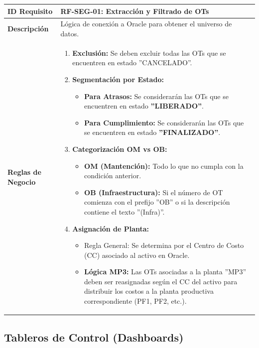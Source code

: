 \documentclass[11pt, letterpaper]{article}
\begin{document}
\begin{longtable}{|p{3.5cm}|p{11.5cm}|}
\hline
\rowcolor{headergray} \textbf{ID Requisito} & \textbf{RF-SEG-01: Extracción y Filtrado de OTs} \\ \hline
\textbf{Descripción} & Lógica de conexión a Oracle para obtener el universo de datos. \\ \hline
\textbf{Reglas de Negocio} & 
\begin{enumerate}
    \item \textbf{Exclusión:} Se deben excluir todas las OTs que se encuentren en estado ''CANCELADO''.
    \item \textbf{Segmentación por Estado:}
    \begin{itemize}
        \item \textbf{Para Atrasos:} Se considerarán las OTs que se encuentren en estado \textbf{''LIBERADO''}.
        \item \textbf{Para Cumplimiento:} Se considerarán las OTs que se encuentren en estado \textbf{''FINALIZADO''}.
    \end{itemize}
    \item \textbf{Categorización OM vs OB:}
    \begin{itemize}\item \textbf{OM (Mantención):} Todo lo que no cumpla con la condición anterior.
        \item \textbf{OB (Infraestructura):} Si el número de OT comienza con el prefijo ''OB'' o si la descripción contiene el texto ''(Infra)''.
        
    \end{itemize}
    \item \textbf{Asignación de Planta:}
    \begin{itemize}
        \item Regla General: Se determina por el Centro de Costo (CC) asociado al activo en Oracle.
        \item \textbf{Lógica MP3:} Las OTs asociadas a la planta ''MP3'' deben ser reasignadas según el CC del activo para distribuir los costos a la planta productiva correspondiente (PF1, PF2, etc.).
    \end{itemize}
\end{enumerate} \\ \hline
\end{longtable}

\subsection{Tableros de Control (Dashboards)}
\end{document}
